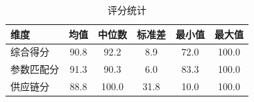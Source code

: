 \begin{table}[h]
\centering
\caption{评分统计}
\label{tab:score_stats}
\footnotesize
\setlength{\tabcolsep}{10pt}      %
\renewcommand{\arraystretch}{0.9} %
\begin{tabular*}{\textwidth}{@{\extracolsep{\fill}}lccccc@{}}
\toprule
\textbf{维度} & \textbf{均值} & \textbf{中位数} & \textbf{标准差} & \textbf{最小值} & \textbf{最大值} \\
\midrule
综合得分   & 90.8 & 92.2 & 8.9  & 72.0 & 100.0 \\
参数匹配分 & 91.3 & 90.3 & 6.0  & 83.3 & 100.0 \\
供应链分   & 88.8 & 100.0 & 31.8 & 10.0 & 100.0 \\
\bottomrule
\end{tabular*}
\end{table}
